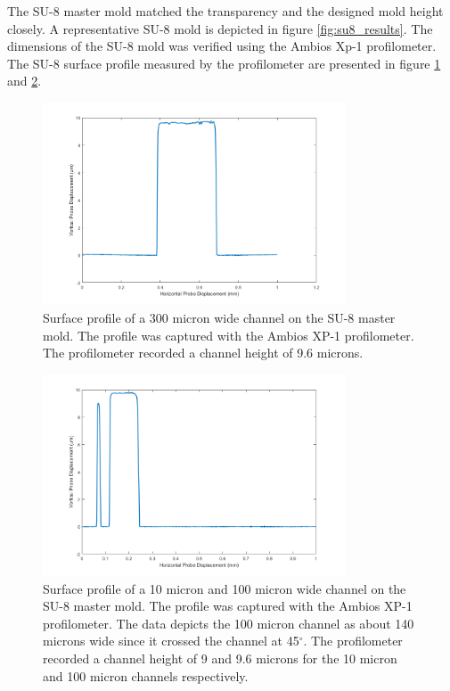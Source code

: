 \par The SU-8 master mold matched the transparency and the designed mold height closely. A representative SU-8 mold is depicted in figure \ref{fig:su8_results}. The dimensions of the SU-8 mold was verified using the Ambios Xp-1 profilometer. The SU-8 surface profile measured by the profilometer are presented in figure \ref{fig:profilometer_300um_channel} and \ref{fig:profilometer_10um_channel_100um_sideways}. 


\begin{figure}[H]
    \centering
    \includegraphics[width=0.8\textwidth]{images/300umWideChannel.png}
    \caption[Surface profile of a 300 micron wide channel on the SU-8 master mold.]{Surface profile of a 300 micron wide channel on the SU-8 master mold. The profile was captured with the Ambios XP-1 profilometer. The profilometer recorded a channel height of 9.6 microns.}
    \label{fig:profilometer_300um_channel}
\end{figure}

\begin{figure}[h]
    \centering
    \includegraphics[width=0.8\textwidth]{images/10umWideAndSidewaysThrough100umWide.png}
    \caption[Surface profile of a 10 micron and 100 micron wide channel on the SU-8 master mold.]{Surface profile of a 10 micron and 100 micron wide channel on the SU-8 master mold. The profile was captured with the Ambios XP-1 profilometer. The data depicts the 100 micron channel as about 140 microns wide since it crossed the channel at 45$^\circ$. The profilometer recorded a channel height of 9 and 9.6 microns for the 10 micron and 100 micron channels respectively.}
    \label{fig:profilometer_10um_channel_100um_sideways}
\end{figure}

